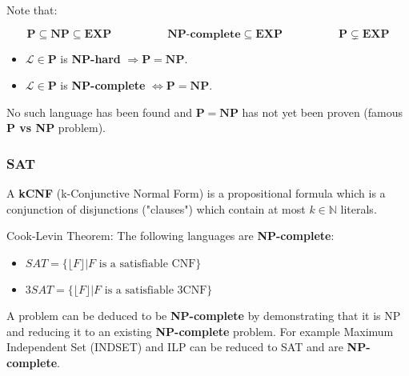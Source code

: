 \documentclass[]{article}
\begin{document}
Note that:

$$
\mathbf{P} \subseteq  \mathbf{NP} \subseteq \mathbf{EXP}
\hspace{5em} 
\textbf{NP-complete} \subseteq \mathbf{EXP}
\hspace{5em} 
\mathbf{P} \subsetneq \mathbf{EXP}
$$

\begin{itemize}
	\item $\mathcal{L} \in \mathbf{P}$ is \textbf{NP-hard} $\Rightarrow \mathbf{P}=\mathbf{N P}$.
	\item $\mathcal{L} \in \mathbf{P}$ is \textbf{NP-complete} $\iff \mathbf{P}=\mathbf{N P}$.
\end{itemize}

No such language has been found and $\mathbf{P}=\mathbf{N P}$ has not yet been proven (famous \textbf{P vs NP} problem).

\subsubsection{SAT}

A \textbf{kCNF} (k-Conjunctive Normal Form) is a propositional formula which is a conjunction of disjunctions ("clauses") which contain at most $k \in \mathbb{N}$ literals.

Cook-Levin Theorem: The following languages are \textbf{NP-complete}:

\begin{itemize}
	\item $SAT = \{\lfloor F \rfloor | F \text{ is a satisfiable CNF}\}$
	\item $3SAT = \{\lfloor F \rfloor | F \text{ is a satisfiable 3CNF}\}$
\end{itemize}

A problem can be deduced to be \textbf{NP-complete} by demonstrating that it is NP and reducing it to an existing \textbf{NP-complete} problem. For example Maximum Independent Set (INDSET) and ILP can be reduced to SAT and are \textbf{NP-complete}.
\end{document}
